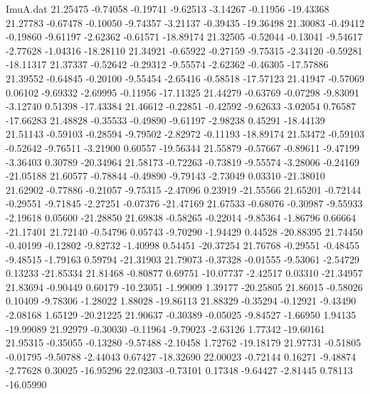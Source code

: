 \begin{filecontents}{ImuA.dat}
  21.25475   -0.74058   -0.19741   -9.62513   -3.14267   -0.11956  -19.43368
  21.27783   -0.67478   -0.10050   -9.74357   -3.21137   -0.39435  -19.36498
  21.30083   -0.49412   -0.19860   -9.61197   -2.62362   -0.61571  -18.89174
  21.32505   -0.52044   -0.13041   -9.54617   -2.77628   -1.04316  -18.28110
  21.34921   -0.65922   -0.27159   -9.75315   -2.34120   -0.59281  -18.11317
  21.37337   -0.52642   -0.29312   -9.55574   -2.62362   -0.46305  -17.57886
  21.39552   -0.64845   -0.20100   -9.55454   -2.65416   -0.58518  -17.57123
  21.41947   -0.57069    0.06102   -9.69332   -2.69995   -0.11956  -17.11325
  21.44279   -0.63769   -0.07298   -9.83091   -3.12740    0.51398  -17.43384
  21.46612   -0.22851   -0.42592   -9.62633   -3.02054    0.76587  -17.66283
  21.48828   -0.35533   -0.49890   -9.61197   -2.98238    0.45291  -18.44139
  21.51143   -0.59103   -0.28594   -9.79502   -2.82972   -0.11193  -18.89174
  21.53472   -0.59103   -0.52642   -9.76511   -3.21900    0.60557  -19.56344
  21.55879   -0.57667   -0.89611   -9.47199   -3.36403    0.30789  -20.34964
  21.58173   -0.72263   -0.73819   -9.55574   -3.28006   -0.24169  -21.05188
  21.60577   -0.78844   -0.49890   -9.79143   -2.73049    0.03310  -21.38010
  21.62902   -0.77886   -0.21057   -9.75315   -2.47096    0.23919  -21.55566
  21.65201   -0.72144   -0.29551   -9.71845   -2.27251   -0.07376  -21.47169
  21.67533   -0.68076   -0.30987   -9.55933   -2.19618    0.05600  -21.28850
  21.69838   -0.58265   -0.22014   -9.85364   -1.86796    0.66664  -21.17401
  21.72140   -0.54796    0.05743   -9.70290   -1.94429    0.44528  -20.88395
  21.74450   -0.40199   -0.12802   -9.82732   -1.40998    0.54451  -20.37254
  21.76768   -0.29551   -0.48455   -9.48515   -1.79163    0.59794  -21.31903
  21.79073   -0.37328   -0.01555   -9.53061   -2.54729    0.13233  -21.85334
  21.81468   -0.80877    0.69751  -10.07737   -2.42517    0.03310  -21.34957
  21.83694   -0.90449    0.60179  -10.23051   -1.99009    1.39177  -20.25805
  21.86015   -0.58026    0.10409   -9.78306   -1.28022    1.88028  -19.86113
  21.88329   -0.35294   -0.12921   -9.43490   -2.08168    1.65129  -20.21225
  21.90637   -0.30389   -0.05025   -9.84527   -1.66950    1.94135  -19.99089
  21.92979   -0.30030   -0.11964   -9.79023   -2.63126    1.77342  -19.60161
  21.95315   -0.35055   -0.13280   -9.57488   -2.10458    1.72762  -19.18179
  21.97731   -0.51805   -0.01795   -9.50788   -2.44043    0.67427  -18.32690
  22.00023   -0.72144    0.16271   -9.48874   -2.77628    0.30025  -16.95296
  22.02303   -0.73101    0.17348   -9.64427   -2.81445    0.78113  -16.05990

\end{filecontents}
